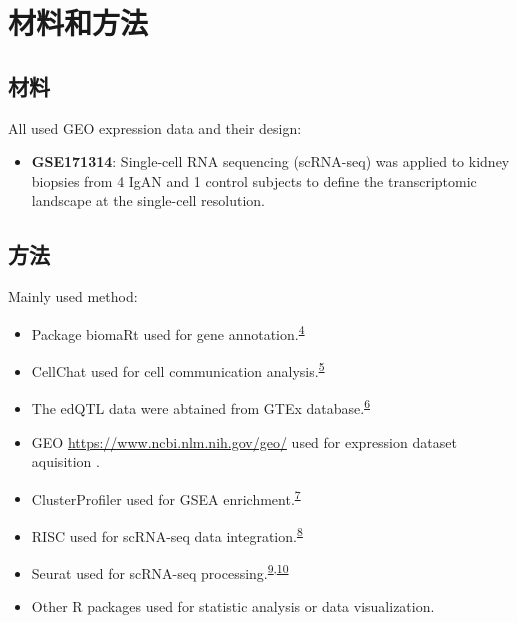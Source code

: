 \documentclass[
]{article}
\providecommand{\tightlist}{%
  \setlength{\itemsep}{0pt}\setlength{\parskip}{0pt}}
\begin{document}
\hypertarget{methods}{%
\section{材料和方法}\label{methods}}

\hypertarget{ux6750ux6599}{%
\subsection{材料}\label{ux6750ux6599}}

All used GEO expression data and their design:

\begin{itemize}
\tightlist
\item
  \textbf{GSE171314}: Single-cell RNA sequencing (scRNA-seq) was applied to kidney biopsies from 4 IgAN and 1 control subjects to define the transcriptomic landscape at the single-cell resolution.
\end{itemize}

\hypertarget{ux65b9ux6cd5}{%
\subsection{方法}\label{ux65b9ux6cd5}}

Mainly used method:

\begin{itemize}
\tightlist
\item
  Package biomaRt used for gene annotation.\textsuperscript{\protect\hyperlink{ref-MappingIdentifDurinc2009}{4}}
\item
  CellChat used for cell communication analysis.\textsuperscript{\protect\hyperlink{ref-InferenceAndAJinS2021}{5}}
\item
  The edQTL data were abtained from GTEx database.\textsuperscript{\protect\hyperlink{ref-TheGtexConsorNone2020}{6}}
\item
  GEO \url{https://www.ncbi.nlm.nih.gov/geo/} used for expression dataset aquisition .
\item
  ClusterProfiler used for GSEA enrichment.\textsuperscript{\protect\hyperlink{ref-ClusterprofilerWuTi2021}{7}}
\item
  RISC used for scRNA-seq data integration.\textsuperscript{\protect\hyperlink{ref-RobustIntegratLiuY2021}{8}}
\item
  Seurat used for scRNA-seq processing.\textsuperscript{\protect\hyperlink{ref-IntegratedAnalHaoY2021}{9},\protect\hyperlink{ref-ComprehensiveIStuart2019}{10}}
\item
  Other R packages used for statistic analysis or data visualization.
\end{itemize}
\end{document}
